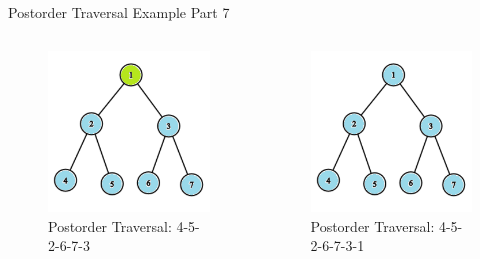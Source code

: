 \documentclass[aspectratio=169]{beamer}%
\begin{document}
\begin{frame}{Postorder Traversal Example Part 7}
    \begin{columns}
        \begin{column}{0.32\textwidth}
            \begin{figure}
                \centering
                \includegraphics[width = .9\linewidth]{tree-post 19.png}
                \caption{Postorder Traversal: 4-5-2-6-7-3}
            \end{figure}
        \end{column}
        \hfill
        \begin{column}{0.32\textwidth}
            \begin{figure}
                \centering
                \includegraphics[width = .9\linewidth]{tree-post 20.png}
                \caption{Postorder Traversal: 4-5-2-6-7-3-1}
            \end{figure}
        \end{column}
    \end{columns}
\end{frame}
\end{document}
